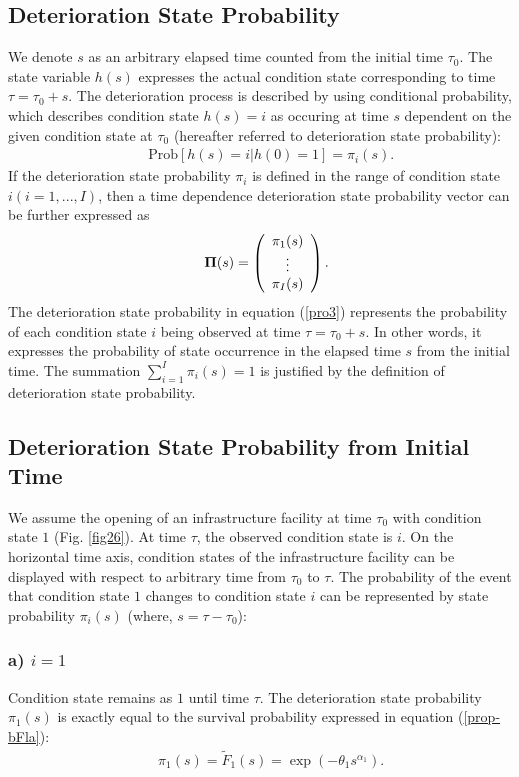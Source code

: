 \subsection{Deterioration State Probability}
\label{331}
We denote $s$ as an arbitrary elapsed time counted from the initial time $\tau_0$. The state variable $h(s)$ expresses the actual condition state corresponding to time $\tau = \tau_0 + s$. The deterioration process is described by using conditional probability, which describes condition state $h(s) = i$ as occuring at time $s$ dependent on the given condition state at $\tau_0$ (hereafter  referred to deterioration state probability):
\begin{eqnarray}
&& \mbox{Prob}[h(s)=i|h(0)=1]=\pi_{i}(s).\label{pro3}
\end{eqnarray}
If the deterioration state probability $\pi_{i}$ is defined in the range of condition state $i (i=1,...,I)$, then a time dependence deterioration state probability vector can be further expressed as
\begin{eqnarray}
&& {\bf \Pi}(s)=\left(
\begin{array}{c}
\pi_{1}(s) \\
\vdots \\
\pi_{I}(s)
\end{array}
\right).
\end{eqnarray}
The deterioration state probability in equation (\ref{pro3}) represents the probability of each condition state $i$ being observed at time $\tau = \tau_0 + s$. In other words, it expresses the  probability of state occurrence in the elapsed time $s$ from the initial time. The summation $\sum_{i=1}^{I}\pi_{i}(s) = 1 $ is justified by the definition of deterioration state probability.
\subsection{Deterioration State Probability from Initial Time}
\label{332}
We assume the opening of an infrastructure facility at time $\tau_0$ with condition state $1$ (Fig. \ref{fig26}). At time $\tau$, the observed condition state is $i$. On the horizontal time axis, condition states of the infrastructure facility can be displayed with respect to arbitrary time from $\tau_0$ to $\tau$. The probability of the event that condition state $1$ changes to condition state $i$ can be represented by state probability $\pi_{i} (s)$ (where, $s = \tau - \tau_0$):
\subsubsection{a) $i=1$ }
\label{3321}
Condition state remains as $1$ until time $\tau$. The deterioration state probability  $\pi_{1}(s)$ is exactly equal to the survival probability expressed in equation (\ref{prop-bFla}):
\begin{eqnarray}
&& \pi_{1}(s)=\tilde{F}_1(s) = \exp (-\theta_1 s^{\alpha_{1}}). \label{ii1}
\end{eqnarray}
